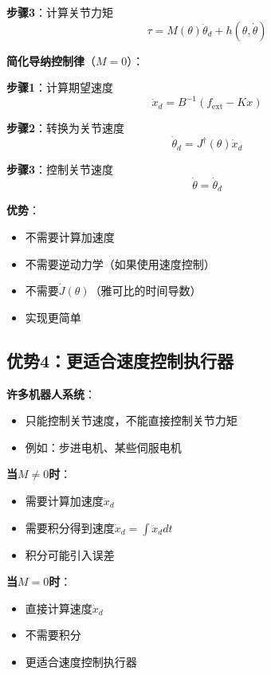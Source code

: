 \documentclass[12pt,a4paper]{article}
\begin{document}
\textbf{步骤3}：计算关节力矩
\begin{equation}
\tau = M(\theta)\ddot{\theta}_d + h(\theta, \dot{\theta})
\end{equation}

\textbf{简化导纳控制律}（$M = 0$）：

\textbf{步骤1}：计算期望速度
\begin{equation}
\dot{x}_d = B^{-1}(f_{\text{ext}} - Kx)
\end{equation}

\textbf{步骤2}：转换为关节速度
\begin{equation}
\dot{\theta}_d = J^{\dagger}(\theta)\dot{x}_d
\end{equation}

\textbf{步骤3}：控制关节速度
\begin{equation}
\dot{\theta} = \dot{\theta}_d
\end{equation}

\textbf{优势}：
\begin{itemize}
\item 不需要计算加速度
\item 不需要逆动力学（如果使用速度控制）
\item 不需要$\dot{J}(\theta)$（雅可比的时间导数）
\item 实现更简单
\end{itemize}

\subsection{优势4：更适合速度控制执行器}

\textbf{许多机器人系统}：
\begin{itemize}
\item 只能控制关节速度，不能直接控制关节力矩
\item 例如：步进电机、某些伺服电机
\end{itemize}

\textbf{当$M \neq 0$时}：
\begin{itemize}
\item 需要计算加速度$\ddot{x}_d$
\item 需要积分得到速度$\dot{x}_d = \int \ddot{x}_d dt$
\item 积分可能引入误差
\end{itemize}

\textbf{当$M = 0$时}：
\begin{itemize}
\item 直接计算速度$\dot{x}_d$
\item 不需要积分
\item 更适合速度控制执行器
\end{itemize}
\end{document}
